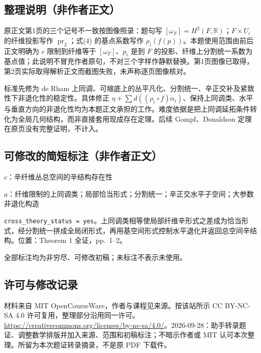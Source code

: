\documentclass[UTF8,11pt]{ctexart}
\theoremstyle{definition}
\newcommand{\R}{\mathbb R}
\begin{document}
\subsection*{整理说明（非作者正文）}
原正文第1页的三个记号不一致按图像照录：题句写 $[\omega_F]=H^2(F,\R)$；$F\times U_i$ 的纤维投影写作 $\operatorname{pr}_2$；式(4) 的基点系数写作 $\rho_i(f(p))$。本题使用范围由前后正文明确为 $c$ 限制到纤维等于 $[\omega_F]$、$p_i$ 是到 $F$ 的投影、纤维上分割统一系数为基点值；此说明不冒充作者原句，不对三个字样作静默替换。第1页图像已取得，第2页实际取得解析正文而截图失败，未声称逐页图像核对。

标准先修为 de Rham 上同调、可缩底上的丛平凡化、分割统一、辛正交补及紧致性下非退化性的稳定性。具体修正 $\eta+\sum d((\rho_i\circ f)\alpha_i)$、保持上同调类、水平与垂直方向的非退化性均为本题正文承担的工作。难度依据是把上同调延拓条件转化为全局几何结构，而非直接套用现成存在定理。后续 Gompf、Donaldson 定理在原页没有完整证明，不计入。
\subsection*{可修改的简短标注（非作者正文）}
$c$：辛纤维丛总空间的辛结构存在性

$a$：纤维限制的上同调类；局部恰当形式；分割统一；辛正交水平子空间；大参数非退化构造

\texttt{cross\_theory\_status = yes}。上同调类相等使局部纤维辛形式之差成为恰当形式，经分割统一拼成全局闭形式，再用基空间形式控制水平退化并返回总空间辛结构。位置：Theorem 1 全证，pp.~1--2。

全部标注均为非穷尽、可修改初稿；未标注不表示未使用。
\subsection*{许可与修改记录}
材料来自 MIT OpenCourseWare，作者与课程见来源。按该站所示 CC BY-NC-SA 4.0 许可复用，整理部分沿用同一许可。\url{https://creativecommons.org/licenses/by-nc-sa/4.0/}。2026-09-28：助手转录题证、调整数学排版并加入来源、范围和初稿标注；不暗示作者或 MIT 认可本次整理。所留为本次题证转录摘录，不是原 PDF 下载件。
\end{document}
